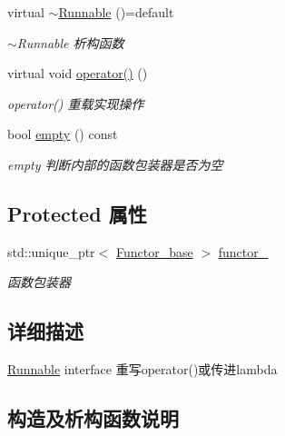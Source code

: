 \begin{DoxyCompactItemize}
\mbox{\label{classRunnable_a08557328273d2dfd3425507b1f972fcb}} 
virtual \hyperlink{classRunnable_a08557328273d2dfd3425507b1f972fcb}{$\sim$\+Runnable} ()=default
\begin{DoxyCompactList}\small\item\em $\sim$\+Runnable 析构函数 \end{DoxyCompactList}\item 
\mbox{\label{classRunnable_a38bf849dab4bbb86fc5bc6e7aff383e0}} 
virtual void \hyperlink{classRunnable_a38bf849dab4bbb86fc5bc6e7aff383e0}{operator()} ()
\begin{DoxyCompactList}\small\item\em operator() 重载实现操作 \end{DoxyCompactList}\item 
bool \hyperlink{classRunnable_a3abba14a5cf19709cef2d299ee68acae}{empty} () const
\begin{DoxyCompactList}\small\item\em empty 判断内部的函数包装器是否为空 \end{DoxyCompactList}\end{DoxyCompactItemize}
\subsection*{Protected 属性}
\begin{DoxyCompactItemize}
\item 
\mbox{\label{classRunnable_a687268c89ddd0d1170687ba764cbc0f2}} 
std\+::unique\+\_\+ptr$<$ \hyperlink{structFunctor__base}{Functor\+\_\+base} $>$ \hyperlink{classRunnable_a687268c89ddd0d1170687ba764cbc0f2}{functor\+\_\+}
\begin{DoxyCompactList}\small\item\em 函数包装器 \end{DoxyCompactList}\end{DoxyCompactItemize}


\subsection{详细描述}
\hyperlink{classRunnable}{Runnable} interface 重写operator()或传进lambda 

\subsection{构造及析构函数说明}
\mbox{\label{classRunnable_ab052afa8b53dd1e7c28e978962839446}} 
